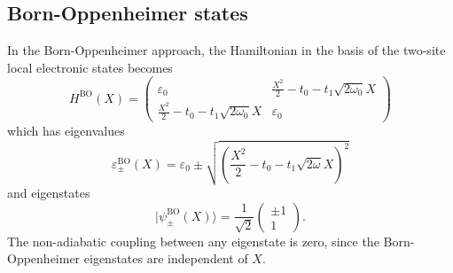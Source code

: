 \documentclass{article}
\begin{document}
\subsection{Born-Oppenheimer states}
In the Born-Oppenheimer approach, the Hamiltonian in the basis of the two-site local electronic states becomes
\begin{equation}
	H^\mathrm{BO}(X)=\begin{pmatrix}
		\varepsilon_0 & \frac{X^2}{2}-t_0-t_1\sqrt{2\omega_0}X\\
		\frac{X^2}{2}-t_0-t_1\sqrt{2\omega_0}X & \varepsilon_0
	\end{pmatrix}
\end{equation}
which has eigenvalues
\begin{equation}
	\varepsilon_\pm^\mathrm{BO}(X) = \varepsilon_0 \pm\sqrt{\left(\frac{X^2}{2}-t_0-t_1\sqrt{2\omega}X\right)^2}
\end{equation}
and eigenstates
\begin{equation}
	\vert\psi_\pm^\mathrm{BO}(X)\rangle = \frac{1}{\sqrt{2}}\begin{pmatrix}
		\pm 1\\
		1
	\end{pmatrix}.
\end{equation}
The non-adiabatic coupling between any eigenstate is zero, since the Born-Oppenheimer eigenstates are independent of $X$.
\end{document}
